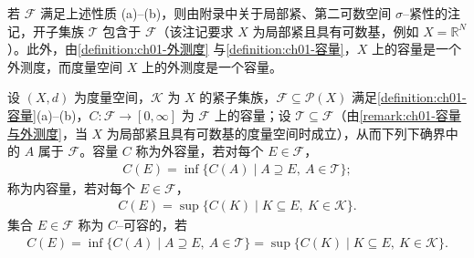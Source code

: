 \documentclass[../../main.tex]{subfiles}%
\begin{document}
\begin{remark}\label{remark:ch01-容量与外测度}
若 $\mathcal{F}$ 满足上述性质 (a)--(b)，则由附录中关于局部紧、第二可数空间 $\sigma$--紧性的注记，开子集族 $\mathcal{T}$ 包含于 $\mathcal{F}$（该注记要求 $X$ 为局部紧且具有可数基，例如 $X=\mathbb{R}^N$）。此外，由\cref{definition:ch01-外测度} 与\cref{definition:ch01-容量}，$X$ 上的容量是一个外测度，而度量空间 $X$ 上的外测度是一个容量。
\end{remark}

\begin{definition}\label{definition:ch01-内外容量}
设 $(X,d)$ 为度量空间，$\mathcal{K}$ 为 $X$ 的紧子集族，$\mathcal{F}\subseteq\mathcal{P}(X)$ 满足\cref{definition:ch01-容量}(a)--(b)，$C:\mathcal{F}\to[0,\infty]$ 为 $\mathcal{F}$ 上的容量；设 $\mathcal{T}\subseteq\mathcal{F}$（由\cref{remark:ch01-容量与外测度}，当 $X$ 为局部紧且具有可数基的度量空间时成立），从而下列下确界中的 $A$ 属于 $\mathcal{F}$。容量 $C$ 称为外容量，若对每个 $E\in\mathcal{F}$，
\begin{align}
C(E)=\inf\{C(A)\mid A\supseteq E,\ A\in\mathcal{T}\}; \label{align:ch01-外容量}
\end{align}
称为内容量，若对每个 $E\in\mathcal{F}$，
\begin{align}
C(E)=\sup\{C(K)\mid K\subseteq E,\ K\in\mathcal{K}\}. \label{align:ch01-内容量}
\end{align}
集合 $E\in\mathcal{F}$ 称为 $C$--可容的，若
\begin{align}
C(E)=\inf\{C(A)\mid A\supseteq E,\ A\in\mathcal{T}\}=\sup\{C(K)\mid K\subseteq E,\ K\in\mathcal{K}\}. \label{align:ch01-可容}
\end{align}
\end{definition}
\end{document}
